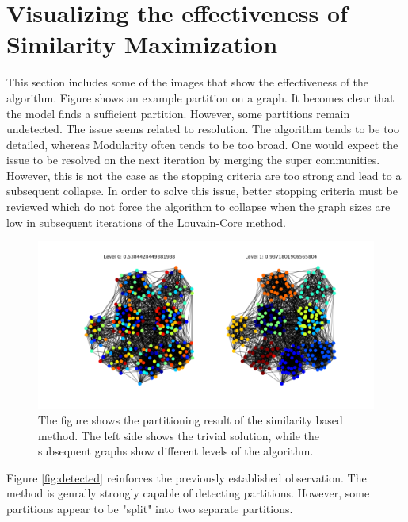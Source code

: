 \documentclass[11pt, twocolumn]{article}
\begin{document}
\section{Visualizing the effectiveness of Similarity Maximization}
This section includes some of the images that show the effectiveness of the algorithm.
Figure shows an example partition on a graph. It becomes clear that the model finds a sufficient partition. However, some partitions remain undetected. The issue seems related to resolution. The algorithm tends to be too detailed, whereas Modularity often tends to be too broad. One would expect the issue to be resolved on the next iteration by merging the super communities. However, this is not the case as the stopping criteria are too strong and lead to a subsequent collapse. In order to solve this issue, better stopping criteria must be reviewed which do not force the algorithm to collapse when the graph sizes are low in subsequent iterations of the Louvain-Core method.

\begin{figure}[h]
  \includegraphics[width=\linewidth]{example.png}
  \caption{The figure shows the partitioning result of the similarity based method. The left side shows the trivial solution, while the subsequent graphs show different levels of the algorithm.}
  \label{fig:example}
\end{figure}

Figure \autoref{fig:detected} reinforces the previously established observation. The method is genrally strongly capable of detecting partitions. However, some partitions appear to be "split" into two separate partitions.
\end{document}
